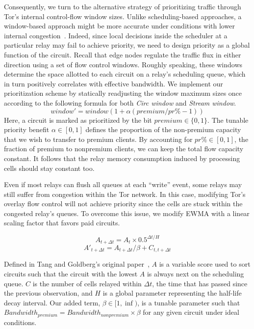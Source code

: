 Consequently, we turn to the alternative strategy of prioritizing traffic through Tor's internal control-flow window sizes.
Unlike scheduling-based approaches, a window-based approach might be more accurate under conditions with lower internal congestion~\cite{archive-2009-mail, kiraly2008solving}.
Indeed, since local decisions inside the scheduler at a particular relay may fail to achieve priority, we need to design priority as a global function of the circuit.
Recall that edge nodes regulate the traffic flux in either direction using a set of flow control windows.
Roughly speaking, these windows determine the space allotted to each circuit on a relay's scheduling queue, which in turn positively correlates with effective bandwidth.
We implement our prioritization scheme by statically readjusting the window maximum sizes once according to the following formula for both \emph{Circ window} and \emph{Stream window}.
\begin{equation} window' = window(1+ \alpha(premium / pr\% - 1)) \label{eq:flow} \end{equation} Here, a circuit is marked as prioritized by the bit $premium \in \{0, 1\}$.
The tunable priority benefit $\alpha \in [0, 1]$ defines the proportion of the non-premium capacity that we wish to transfer to premium clients.
By accounting for $pr\% \in [0,1]$, the fraction of premium to nonpremium clients, we can keep the total flow capacity constant.
It follows that the relay memory consumption induced by processing cells should stay constant too.

Even if most relays can flush all queues at each ``write'' event, some relays may still suffer from congestion within the Tor network.
In this case, modifying Tor's overlay flow control will not achieve priority since the cells are stuck within the congested relay's queues.
To overcome this issue, we modify EWMA with a linear scaling factor that favors paid circuits.

\begin{equation}
  A_{t + \Delta t} = A_t \times 0.5^{\Delta t/H}
\end{equation}
\begin{equation}
  A'_{t + \Delta t} = A_{t + \Delta t} / \beta + C_{t, t + \Delta t}
\end{equation}

Defined in Tang and Goldberg's original paper~\cite{tang2010improved}, $A$ is a variable score used to sort circuits such that the circuit with the lowest $A$ is always next on the scheduling queue.
$C$ is the number of cells relayed within $\Delta t$, the time that has passed since the previous observation, and $H$ is a global parameter representing the half-life decay interval.
Our added term, $\beta \in [1, \inf)$, is a tunable parameter such that $\mathit{Bandwidth}_{\mathit{premium}} = \mathit{Bandwidth}_{\mathit{nonpremium}} \times \beta$ for any given circuit under ideal conditions.

